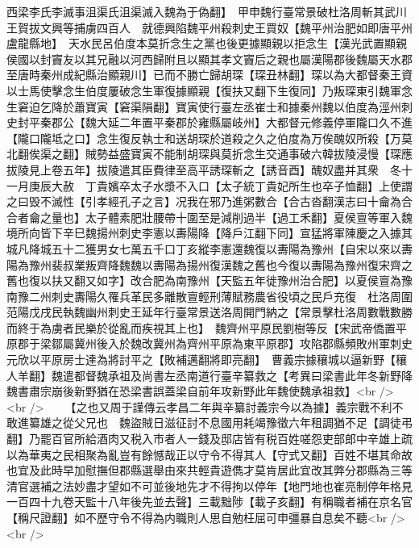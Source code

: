 西梁李氏李滅事沮渠氏沮渠滅入魏為于偽翻】　甲申魏行臺常景破杜洛周斬其武川王賀拔文興等捕虜四百人　就德興陷魏平州殺刺史王買奴【魏平州治肥如即唐平州盧龍縣地】　天水民呂伯度本莫折念生之黨也後更據顯親以拒念生【漢光武置顯親侯國以封竇友以其兄融以河西歸附且以顯其孝文竇后之親也屬漢陽郡後魏屬天水郡至唐時秦州成紀縣治顯親川】已而不勝亡歸胡琛【琛丑林翻】琛以為大都督秦王資以士馬使擊念生伯度屢破念生軍復據顯親【復扶又翻下生復同】乃叛琛東引魏軍念生窘迫乞降於蕭寶寅【窘渠隕翻】寶寅使行臺左丞崔士和據秦州魏以伯度為涇州刺史封平秦郡公【魏大延二年置平秦郡於雍縣屬岐州】大都督元修義停軍隴口久不進【隴口隴坻之口】念生復反執士和送胡琛於道殺之久之伯度為万俟醜奴所殺【万莫北翻俟渠之翻】賊勢益盛寶寅不能制胡琛與莫折念生交通事破六韓拔陵浸慢【琛應拔陵見上卷五年】拔陵遣其臣費律至高平誘琛斬之【誘音酉】醜奴盡并其衆　冬十一月庚辰大赦　丁貴嬪卒太子水漿不入口【太子統丁貴妃所生也卒子恤翻】上使謂之曰毁不滅性【引孝經孔子之言】况我在邪乃進粥數合【合古沓翻漢志曰十龠為合合者龠之量也】太子體素肥壯腰帶十圍至是減削過半【過工禾翻】夏侯亶等軍入魏境所向皆下辛巳魏揚州刺史李憲以夀陽降【降戶江翻下同】宣猛將軍陳慶之入據其城凡降城五十二獲男女七萬五千口丁亥縱李憲還魏復以夀陽為豫州【自宋以來以夀陽為豫州裴叔業叛齊降魏魏以夀陽為揚州復漢魏之舊也今復以夀陽為豫州復宋齊之舊也復以扶又翻又如字】改合肥為南豫州【天監五年徙豫州治合肥】以夏侯亶為豫南豫二州刺史夀陽久罹兵革民多離散亶輕刑薄賦務農省役頃之民戶充復　杜洛周圍范陽戊戌民執魏幽州刺史王延年行臺常景送洛周開門納之【常景擊杜洛周數戰數勝而終于為虜者民樂於從亂而疾視其上也】　魏齊州平原民劉樹等反【宋武帝僑置平原郡于梁鄒屬冀州後入於魏改冀州為齊州平原為東平原郡】攻陷郡縣頻敗州軍刺史元欣以平原房士達為將討平之【敗補邁翻將即亮翻】　曹義宗據穰城以逼新野【穰人羊翻】魏遣都督魏承祖及尚書左丞南道行臺辛纂救之【考異曰梁書此年冬新野降魏書肅宗崩後新野猶在恐梁書誤蓋梁自前年攻新野此年魏使魏承祖救】<br />
<br />
　　【之也又周于謹傳云孝昌二年與辛纂討義宗今以為據】義宗戰不利不敢進纂雄之從父兄也　魏盜賊日滋征討不息國用耗竭豫徵六年租調猶不足【調徒弔翻】乃罷百官所給酒肉又税入市者人一錢及邸店皆有税百姓嗟怨吏部郎中辛雄上疏以為華夷之民相聚為亂豈有餘憾哉正以守令不得其人【守式又翻】百姓不堪其命故也宜及此時早加慰撫但郡縣選舉由來共輕貴遊儁才莫肯居此宜改其弊分郡縣為三等清官選補之法妙盡才望如不可並後地先才不得拘以停年【地門地也崔亮制停年格見一百四十九卷天監十八年後先並去聲】三載黜陟【載子亥翻】有稱職者補在京名官【稱尺證翻】如不歷守令不得為内職則人思自勉枉屈可申彊暴自息矣不聽<br />
<br />
